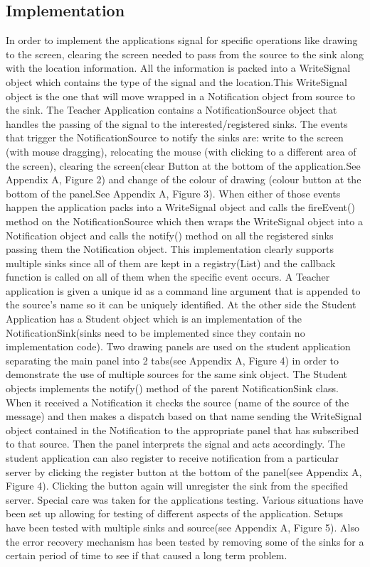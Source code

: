 \documentclass[a4paper,12pt,titlepage]{article}
\begin{document}
\subsection{Implementation}
In order to implement the applications signal for specific operations like drawing to the screen, clearing the screen needed to pass from the source to the sink along with the location information. All the information is packed into a WriteSignal object which contains the type of the signal and the location.This WriteSignal object is the one that will move wrapped in a Notification object from source to the sink. The Teacher Application contains a NotificationSource object that handles the passing of the signal to the interested/registered sinks. The events that trigger the NotificationSource to notify the sinks are: write to the screen (with mouse dragging), relocating the mouse (with clicking to a different area of the screen), clearing the screen(clear Button at the bottom of the application.See Appendix A, Figure 2) and change of the colour of drawing (colour button at the bottom of the panel.See Appendix A, Figure 3). When either of those events happen the application packs into a WriteSignal object and calls the fireEvent() method on the NotificationSource which then wraps the WriteSignal object into a Notification object and calls the notify() method on all the registered sinks passing them the Notification object. This implementation clearly supports multiple sinks since all of them are kept in a registry(List) and the callback function is called on all of them when the specific event occurs. A Teacher application is given a unique id as a command line argument that is appended to the source's name so it can be uniquely identified. At the other side the Student Application has a Student object which is an implementation of the NotificationSink(sinks need to be implemented since they contain no implementation code). Two drawing panels are used on the student application separating the main panel into 2 tabs(see Appendix A, Figure 4) in order to demonstrate the use of multiple sources for the same sink object. The Student objects implements the notify() method of the parent NotificationSink class. When it received a Notification it checks the source (name of the source of the message) and then makes a dispatch based on that name sending the WriteSignal object contained in the Notification to the appropriate panel that has subscribed to that source. Then the panel interprets the signal and acts accordingly. The student application can also register to receive notification from a particular server by clicking the register button at the bottom of the panel(see Appendix A, Figure 4). Clicking the button again will unregister the sink from the specified server. Special care was taken for the applications testing. Various situations have been set up allowing for testing of different aspects of the application. Setups have been tested with multiple sinks and source(see Appendix A, Figure 5). Also the error recovery mechanism has been tested by removing some of the sinks for a certain period of time to see if that caused a long term problem.
\end{document}
